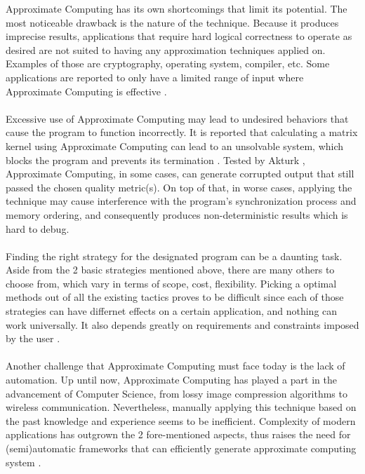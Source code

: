 Approximate Computing has its own shortcomings that limit its potential. The most noticeable drawback is the nature of the technique. Because it produces imprecise results, applications that require hard logical correctness to operate as desired are not suited to having any approximation techniques applied on. Examples of those are cryptography, operating system, compiler, etc. Some applications are reported to only have a limited range of input where Approximate Computing is effective \cite{AxCSurvey}. \\
~\\
Excessive use of Approximate Computing may lead to undesired behaviors that cause the program to function incorrectly. It is reported that calculating a matrix kernel using Approximate Computing can lead to an unsolvable system, which blocks the program and prevents its termination \cite{AxCSurvey}. Tested by Akturk \cite{Akturk2015OnQO}, Approximate Computing, in some cases, can generate corrupted output that still passed the chosen quality metric(s). On top of that, in worse cases, applying the technique may cause interference with the program's synchronization process and memory ordering, and consequently produces non-deterministic results which is hard to debug.\\
~\\
Finding the right strategy for the designated program can be a daunting task. Aside from the 2 basic strategies mentioned above, there are many others to choose from, which vary in terms of scope, cost, flexibility. Picking a optimal methods out of all the existing tactics proves to be difficult since each of those strategies can have differnet effects on a certain application, and nothing can work universally. It also depends greatly on requirements and constraints imposed by the user \cite{Ansel}. \\
~\\
Another challenge that Approximate Computing must face today is the lack of automation. Up until now, Approximate Computing has played a part in the advancement of Computer Science, from lossy image compression algorithms to wireless communication. Nevertheless, manually applying this technique based on the past knowledge and experience seems to be inefficient. Complexity of modern applications has outgrown the 2 fore-mentioned aspects, thus raises the need for (semi)automatic frameworks that can efficiently generate approximate computing system \cite{introAxC}. \\

